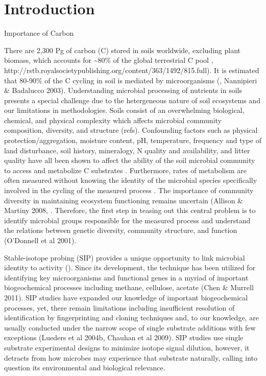 \section{Introduction}

Importance of Carbon 

There are 2,300 Pg of carbon (C) stored in soils worldwide, excluding plant biomass, which accounts for \sim80\% of the global terrestrial C pool \cite{Amundson_2001,IPCC 2000,IPCC 2007,elsen_Ayres_Wall_Bardgett_2011,Lal_2008,BATJES_1996}, http://rstb.royalsocietypublishing.org/content/363/1492/815.full). It is estimated that 80-90\% of the C cycling in soil is mediated by microorganisms (\cite{ColemanCrossley_1996}, Nannipieri & Badalucco 2003). Understanding microbial processing of nutrients in soils presents a special challenge due to the hetergeneous nature of soil ecosystems and our limitations in methodologies. Soils consist of an overwhelming biological, chemical, and physical complexity which affects microbial community composition, diversity, and structure (refs).  Confounding factors such as physical protection/aggregation, moisture content, pH, temperature, frequency and type of land disturbance, soil history, mineralogy, N quality and availability, and litter quality have all been shown to affect the ability of the soil microbial community to access and metabolize C substrates \cite{Schlesinger_1977,dgett_Wall_Hattenschwiler_2010,Sollins_Homann_Caldwell_1996,Torn_Vitousek_Trumbore_2005,TRUMBORE_2006}. Furthermore, rates of metabolism are often measured without knowing the identity of the microbial species specifically involved in the cycling of the measured process \cite{ndi_Pietramellara_Renella_2003}.  The importance of community diversity in maintaining ecosystem functioning remains uncertain (Allison & Martiny 2008, \cite{ndi_Pietramellara_Renella_2003}. Therefore, the first step in teasing out this central problem is to identify microbial groups responsible for the measured process and understand the relations between genetic diversity, community structure, and function (O’Donnell et al 2001).  

Stable-isotope probing (SIP) provides a unique opportunity to link microbial identity to activity (\cite{Chen_Murrell_2010}). Since its development, the technique has been utilized for identifying key microorganisms and functional genes in a myriad of important biogeochemical processes including methane, cellulose, acetate (Chen & Murrell 2011). SIP studies have expanded our knowledge of important biogeochemical processes, yet, there remain limitations including insufficient resolution of identification by fingerprinting and cloning techniques and, to our knowledge, are usually conducted under the narrow scope of single substrate additions with few exceptions (Lueders et al 2004b, Chauhan et al 2009). SIP studies use single substrate experimental designs to minimize isotope signal dilution, however, it detracts from how microbes may experience that substrate naturally, calling into question its environmental and biological relevance.

